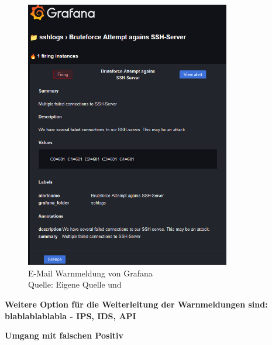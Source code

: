 \begin{figure}[H]
   \centering
   \includegraphics[width=0.8\textwidth]{assets/GrafanaWarnmeldung.png}
   \caption{E-Mail Warnmeldung von Grafana \\Quelle: Eigene Quelle und \citep{Grafana_alerting}}
   \centering
\end{figure}

\textbf{Weitere Option für die Weiterleitung der Warnmeldungen sind: blablablablabla - IPS, IDS, API}

\textbf{Umgang mit falschen Positiv}




